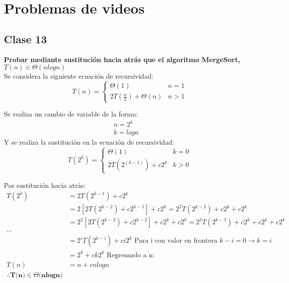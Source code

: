 \section*{Problemas de videos}
    \subsection*{Clase 13}
        \textbf{Probar mediante sustitución hacia atrás que el algoritmo MergeSort,} $T(n) \in \Theta(nlogn)$ \\
            Se considera la siguiente ecuación de recursividad:
            \begin{equation*}
                \quad T(n)=
                \left\{
                \begin{array}{lc}
                    \Theta(1) & n=1 \\
                    2T\left(\frac{n}{2} \right)+\Theta(n) & n>1
                \end{array}
                \right.
            \end{equation*}
            
            Se realiza un cambio de variable de la forma:
            \begin{equation*}
                \begin{split}
                    n=2^k \\
                    k=logn
                \end{split}
            \end{equation*}
            Y se realiza la sustitución en la ecuación de recursividad:
            \begin{equation*}
                \quad T(2^k)=
                \left\{
                \begin{array}{lc}
                    \Theta(1) & k=0 \\
                    2T\left(2^{(k-1)} \right)+c2^k & k>0
                \end{array}
                \right.
            \end{equation*}
        
        Por sustitución hacia atrás:
        \begin{equation*}
            \begin{split}
                T(2^k) & =2T\left(2^{k-1}\right)+c2^k \\
                & = 2[2T\left(2^{k-2}\right)+c2^{k-1}]+c2^{k} = 2^2T\left(2^{k-2}\right)+c2^{k}+c2^{k} \\
                & = 2^2[2T\left(2^{k-3}\right)+c2^{k-2}]+c2^k +c2^k =  2^3T\left(2^{k-3}\right)+c2^{k}+c2^{k}+c2^{k}\\
                \dots \\
                & = 2^iT\left(2^{k-i}\right)+ci2^k\text{ Para i con valor en frontera }k-i=0\rightarrow k=i\\
                & = 2^k+ck2^k \text{ Regresando a n:}\\
                T(n) & =n+cnlogn\\
                \therefore \textbf{T(n)}\in \Theta\textbf{(nlogn)}
            \end{split}
        \end{equation*}
    
